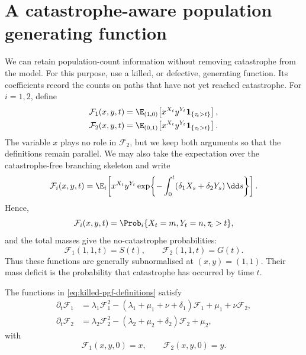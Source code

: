 \section{A catastrophe-aware population generating function}
\label{app:catastrophe-pgf}

We can retain population-count information without removing catastrophe from the model. For this purpose, use a killed, or defective, generating function. Its coefficients record the counts on paths that have not yet reached catastrophe. For $i=1,2$, define
\begin{subequations}
\label{eq:killed-pgf-definitions}
\begin{align}
\mathcal F_1(x,y,t)
&=\E_{(1,0)}
\!\left[x^{X_t}y^{Y_t}\boldsymbol 1_{\{\tau_{\!c}>t\}}\right],
\\
\mathcal F_2(x,y,t)
&=\E_{(0,1)}
\!\left[x^{X_t}y^{Y_t}\boldsymbol 1_{\{\tau_{\!c}>t\}}\right].
\end{align}
\end{subequations}
The variable $x$ plays no role in $\mathcal F_2$, but we keep both arguments so that the definitions remain parallel. We may also take the expectation over the catastrophe-free branching skeleton and write
\begin{equation*}
\mathcal F_i(x,y,t)
=\E_i\!\left[
x^{X_t}y^{Y_t}
\exp\!\left\{-\int_0^t
(\delta_1X_s+\delta_2Y_s)\,\dd s\right\}\right].
\end{equation*}
Hence,
\begin{equation*}
[x^my^n]\mathcal F_i(x,y,t)
=\Prob_i\{X_t=m,Y_t=n,\tau_{\!c}>t\},
\end{equation*}
and the total masses give the no-catastrophe probabilities:
\begin{equation*}
\mathcal F_1(1,1,t)=S(t),
\qquad
\mathcal F_2(1,1,t)=G(t).
\end{equation*}
Thus these functions are generally subnormalised at $(x,y)=(1,1)$. Their mass deficit is the probability that catastrophe has occurred by time $t$.

\begin{proposition}
\label{prop:killed-pgf-backward}
The functions in \cref{eq:killed-pgf-definitions} satisfy
\begin{subequations}
\label{eq:killed-pgf-backward}
\begin{align}
\partial_t\mathcal F_1
&=\lambda_1\mathcal F_1^2
-(\lambda_1+\mu_1+\nu+\delta_1)\mathcal F_1
+\mu_1+\nu\mathcal F_2,
\\
\partial_t\mathcal F_2
&=\lambda_2\mathcal F_2^2
-(\lambda_2+\mu_2+\delta_2)\mathcal F_2
+\mu_2,
\end{align}
\end{subequations}
with
\begin{equation}
\label{eq:killed-pgf-initial}
\mathcal F_1(x,y,0)=x,
\qquad
\mathcal F_2(x,y,0)=y.
\end{equation}
\end{proposition}

